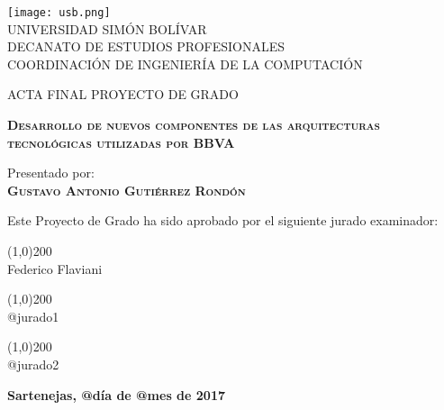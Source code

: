 \begin{titlepage}
\begin{center}

\texttt{[image: usb.png]} \\

\textsc {\large UNIVERSIDAD SIMÓN BOLÍVAR} \\
\textsc{DECANATO DE ESTUDIOS PROFESIONALES\\
COORDINACIÓN DE INGENIERÍA DE LA COMPUTACIÓN}

\bigskip
\bigskip
\bigskip
\bigskip
\bigskip
\bigskip

\textsc{ACTA FINAL PROYECTO DE GRADO}

\bigskip
\bigskip

\textsc{\bfseries Desarrollo de nuevos componentes de las arquitecturas
        tecnológicas utilizadas por BBVA}
\bigskip
\bigskip
\bigskip
\bigskip

\begin{minipage}{\textwidth}
\centering
Presentado por: \\
\textsc{\bfseries Gustavo Antonio Gutiérrez Rondón} \\

\bigskip
\bigskip
\bigskip

Este Proyecto de Grado ha sido aprobado por el siguiente jurado examinador: \\

\bigskip
\bigskip

\line(1,0){200} \\
Federico Flaviani\\

\bigskip
\bigskip

\line(1,0){200} \\
@jurado1\\

\bigskip
\bigskip

\line(1,0){200} \\
@jurado2\\
\end{minipage}

\bigskip
\bigskip
\vfill

{\large \bfseries Sartenejas, @día de @mes de 2017}

\end{center}
\end{titlepage}
